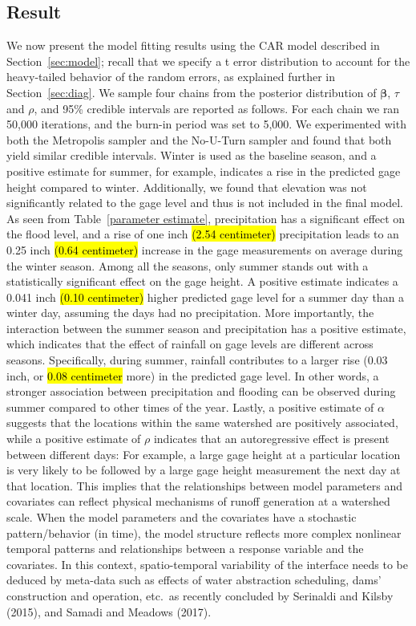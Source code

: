 \subsection{Result}\label{subsec:reported_result}
We now present the model fitting results using the CAR model described in Section~\ref{sec:model}; recall that we specify a t error distribution to account for the heavy-tailed behavior of the random errors, as explained further in Section~\ref{sec:diag}.
We sample four chains from the posterior distribution of $\boldsymbol{\beta}$, $\tau$ and $\rho$, and 95\% credible intervals are reported as follows.
For each chain we ran 50,000 iterations, and the burn-in period was set to 5,000.
We experimented with both the Metropolis sampler and the No-U-Turn sampler and found that both yield similar credible intervals.
 Winter is used as the baseline season, and a positive estimate for summer, for example, indicates a rise in the predicted gage height compared to winter.
 Additionally, we found that elevation  was not significantly related to the gage level and thus is not included in the final model. \\

As seen from Table~\ref{parameter estimate}, precipitation has a significant effect on the flood level, and a rise of one inch \hl{(2.54 centimeter)} precipitation leads to an 0.25 inch \hl{(0.64 centimeter)} increase in the gage measurements on average during the winter season.
Among all the seasons, only summer stands out with a statistically significant effect on the gage height.
A positive estimate indicates a 0.041 inch \hl{(0.10 centimeter)} higher predicted gage level for a summer day than a winter day, assuming the days had no precipitation.
More importantly, the interaction between the summer season and precipitation has a positive estimate, which indicates that the effect of rainfall on gage levels are different across seasons.
Specifically, during  summer,  rainfall contributes to a larger rise (0.03 inch, or  \hl{0.08 centimeter} more) in the predicted gage level.
In other words, a stronger association between precipitation and flooding can be observed during summer compared to other times of the year.
 Lastly, a positive estimate of $ \alpha$ suggests that the locations within the same watershed are positively associated, while a positive estimate of $ \rho$ indicates that an autoregressive effect is present between different days: For example, a large gage height at a particular location is very likely to be followed by a large gage height measurement the next day at that location.
This implies that the relationships between model parameters and covariates can reflect physical mechanisms of runoff generation at a watershed scale.
When the model parameters and the covariates have a stochastic pattern/behavior (in time), the model structure reflects more complex nonlinear temporal patterns and relationships between a response variable and the covariates.
In this context, spatio-temporal variability of the interface needs to be deduced by meta-data such as effects of water abstraction scheduling, dams' construction and operation, etc.\ as recently concluded by Serinaldi and Kilsby (2015), and Samadi and Meadows (2017).

